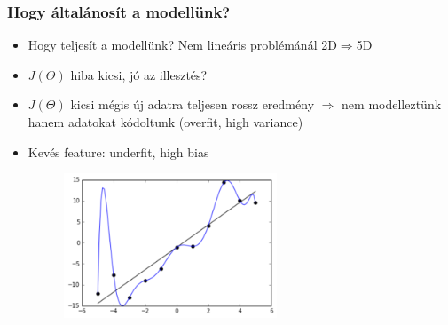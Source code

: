 \documentclass{beamer}
\begin{document}
\begin{frame}
\frametitle{Hogy általánosít a modellünk?}
\begin{itemize}
  \setlength{\itemsep}{6pt}

\item Hogy teljesít a modellünk? Nem lineáris problémánál 2D$\Rightarrow$5D
\item $J(\Theta)$ hiba kicsi, jó az illesztés?
\item $J(\Theta)$ kicsi mégis új adatra teljesen rossz eredmény $\Rightarrow$ nem modelleztünk hanem adatokat kódoltunk (overfit, high variance)
\item Kevés feature: underfit, high bias
\begin{figure}[H]
	\centering
    		\includegraphics[width=0.6\textwidth]{pic/nn/5}
\end{figure}
\end{itemize}
\end{frame}
\end{document}
